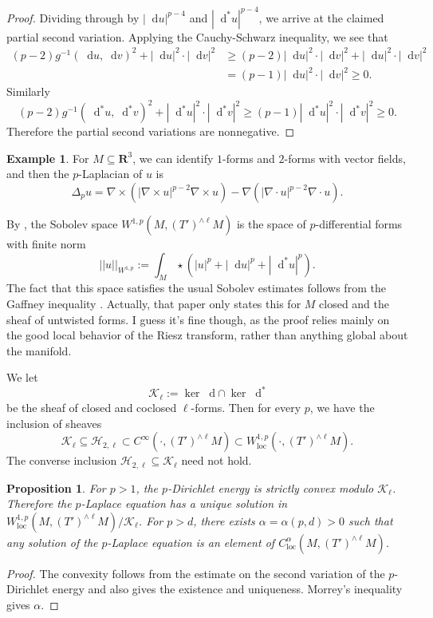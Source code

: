 \documentclass[reqno,10pt]{amsart}
\newcommand{\RR}{\mathbf{R}}
\newcommand*\dif{\mathop{}\!\mathrm{d}}
\newcommand{\loc}{\mathrm{loc}}
\newtheorem{proposition}[theorem]{Proposition}
\theoremstyle{definition}
\newtheorem{example}[theorem]{Example}
\numberwithin{equation}{section}
\begin{document}
\begin{proof}
Dividing through by $|\dif u|^{p - 4}$ and $|\dif^* u|^{p - 4}$, we arrive at the claimed partial second variation.
Applying the Cauchy-Schwarz inequality, we see that 
\begin{align*}
(p - 2) g^{-1}(\dif u, \dif v)^2 + |\dif u|^2 \cdot |\dif v|^2 &\geq (p - 2) |\dif u|^2 \cdot |\dif v|^2 + |\dif u|^2 \cdot |\dif v|^2 \\
&= (p - 1) |\dif u|^2 \cdot |\dif v|^2 \geq 0.
\end{align*}
Similarly
$$(p - 2) g^{-1}(\dif^* u, \dif^* v)^2 + |\dif^* u|^2 \cdot |\dif^* v|^2 \geq (p - 1) |\dif^* u|^2 \cdot |\dif^* v|^2 \geq 0.$$
Therefore the partial second variations are nonnegative.
\end{proof}

\begin{example}
For $M \subseteq \RR^3$, we can identify $1$-forms and $2$-forms with vector fields, and then the $p$-Laplacian of $u$ is 
$$\Delta_p u = \nabla \times (|\nabla \times u|^{p - 2} \nabla \times u) - \nabla(|\nabla \cdot u|^{p - 2} \nabla \cdot u).$$
\end{example}

By \cite[\S3]{Scott95}, the Sobolev space $W^{1, p}(M, (T')^{\wedge \ell} M)$ is the space of $p$-differential forms with finite norm 
$$||u||_{W^{1, p}} := \int_M \star(|u|^p + |\dif u|^p + |\dif^* u|^p).$$
The fact that this space satisfies the usual Sobolev estimates follows from the Gaffney inequality \cite[Proposition 4.3]{Scott95}.
Actually, that paper only states this for $M$ closed and the sheaf of untwisted forms.
I guess it's fine though, as the proof relies mainly on the good local behavior of the Riesz transform, rather than anything global about the manifold.

We let
$$\mathscr K_\ell := \ker \dif \cap \ker \dif^*$$
be the sheaf of closed and coclosed $\ell$-forms.
Then for every $p$, we have the inclusion of sheaves
$$\mathscr K_\ell \subseteq \mathscr H_{2, \ell} \subset C^\infty(\cdot, (T')^{\wedge \ell} M) \subset W^{1, p}_\loc(\cdot, (T')^{\wedge \ell} M).$$
The converse inclusion $\mathscr H_{2, \ell} \subseteq \mathscr K_\ell$ need not hold.

\begin{proposition}
For $p > 1$, the $p$-Dirichlet energy is strictly convex modulo $\mathscr K_\ell$.
Therefore the $p$-Laplace equation has a unique solution in $W^{1, p}_\loc(M, (T')^{\wedge \ell} M)/\mathscr K_\ell$.
For $p > d$, there exists $\alpha = \alpha(p, d) > 0$ such that any solution of the $p$-Laplace equation is an element of $C^\alpha_\loc(M, (T')^{\wedge \ell} M)$.
\end{proposition}
\begin{proof}
The convexity follows from the estimate on the second variation of the $p$-Dirichlet energy and also gives the existence and uniqueness.
Morrey's inequality gives $\alpha$.
\end{proof}
\end{document}
